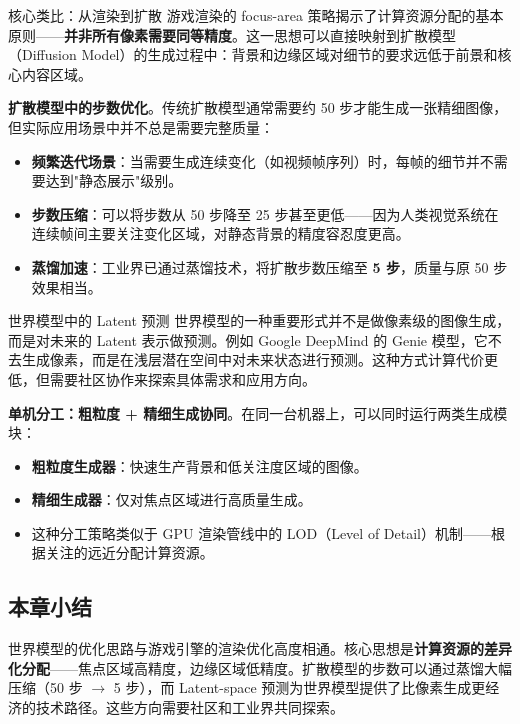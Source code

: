 \documentclass[a4paper]{article}
\begin{document}
\begin{importantbox}{核心类比：从渲染到扩散}
游戏渲染的 focus-area 策略揭示了计算资源分配的基本原则——\textbf{并非所有像素需要同等精度}。这一思想可以直接映射到扩散模型（Diffusion Model）的生成过程中：背景和边缘区域对细节的要求远低于前景和核心内容区域。
\end{importantbox}

\textbf{扩散模型中的步数优化}。传统扩散模型通常需要约 50 步才能生成一张精细图像，但实际应用场景中并不总是需要完整质量：

\begin{itemize}
\item \textbf{频繁迭代场景}：当需要生成连续变化（如视频帧序列）时，每帧的细节并不需要达到"静态展示"级别。
\item \textbf{步数压缩}：可以将步数从 50 步降至 25 步甚至更低——因为人类视觉系统在连续帧间主要关注变化区域，对静态背景的精度容忍度更高。
\item \textbf{蒸馏加速}：工业界已通过蒸馏技术，将扩散步数压缩至 \textbf{5 步}，质量与原 50 步效果相当。
\end{itemize}

\begin{knowledgebox}{世界模型中的 Latent 预测}
世界模型的一种重要形式并不是做像素级的图像生成，而是对未来的 Latent 表示做预测。例如 Google DeepMind 的 Genie 模型，它不去生成像素，而是在浅层潜在空间中对未来状态进行预测。这种方式计算代价更低，但需要社区协作来探索具体需求和应用方向。
\end{knowledgebox}

\textbf{单机分工：粗粒度 + 精细生成协同}。在同一台机器上，可以同时运行两类生成模块：

\begin{itemize}
\item \textbf{粗粒度生成器}：快速生产背景和低关注度区域的图像。
\item \textbf{精细生成器}：仅对焦点区域进行高质量生成。
\item 这种分工策略类似于 GPU 渲染管线中的 LOD（Level of Detail）机制——根据关注的远近分配计算资源。
\end{itemize}

\subsection{本章小结}

世界模型的优化思路与游戏引擎的渲染优化高度相通。核心思想是\textbf{计算资源的差异化分配}——焦点区域高精度，边缘区域低精度。扩散模型的步数可以通过蒸馏大幅压缩（50 步 $\rightarrow$ 5 步），而 Latent-space 预测为世界模型提供了比像素生成更经济的技术路径。这些方向需要社区和工业界共同探索。
\end{document}
